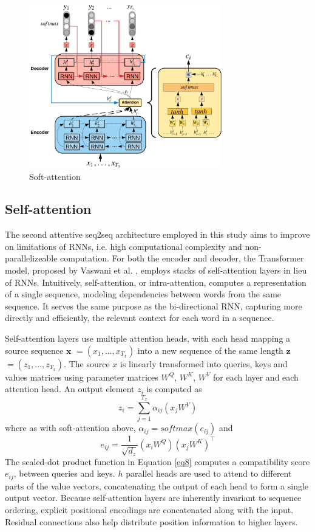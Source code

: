 \documentclass[a4paper]{article}
\begin{document}
\begin{figure}[h]
  \centering
  \includegraphics[width=3.3in]{soft-attention_io.pdf}
  \caption{Soft-attention}
  \label{fig:Bahdanau_soft_attention}
\end{figure}

\subsection{Self-attention}

The second attentive seq2seq architecture employed in this study aims to improve on limitations of RNNs, i.e. high computational complexity and non-parallelizeable computation. For both the encoder and decoder, the Transformer model, proposed by Vaswani et al. \cite{vaswani2017attention}, employs stacks of self-attention layers in lieu of RNNs. Intuitively, self-attention, or intra-attention, computes a representation of a single sequence, modeling dependencies between words from the same sequence. It serves the same purpose as the bi-directional RNN, capturing more directly and efficiently, the relevant context for each word in a sequence. 

Self-attention layers use multiple attention heads, with each head mapping a source sequence $\mathbf x$ $=(x_1,...,x_{T_x})$ into a new sequence of the same length $\mathbf z$ $=(z_1,...,z_{T_x})$. The source $x$ is linearly transformed into queries, keys and values matrices using parameter matrices $W^Q$, $W^K$, $W^V$ for each layer and each attention head. An output element $z_i$ is computed as
\begin{equation}
 	z_{i} = \sum\limits_{j=1}^{T_x} {\alpha}_{{i}{j}}({x_j}W^V)
  \label{eq6}
\end{equation}
where as with soft-attention above, ${\alpha}_{{i}{j}} = softmax(e_{{i}{j}})$ and 
\begin{equation}
 	 e_{ij} = \frac{1}{\sqrt{d_z}}(x_i W^Q)(x_j W^K)^\top
   \label{eq8}
\end{equation}
The scaled-dot product function in Equation \ref{eq8} computes a compatibility score $e_{ij}$, between queries and keys. $h$ parallel heads are used to attend to different parts of the value vectors, concatenating the output of each head to form a single output vector. Because self-attention layers are inherently invariant to sequence ordering, explicit positional encodings are concatenated along with the input. Residual connections also help distribute position information to higher layers.
\end{document}
